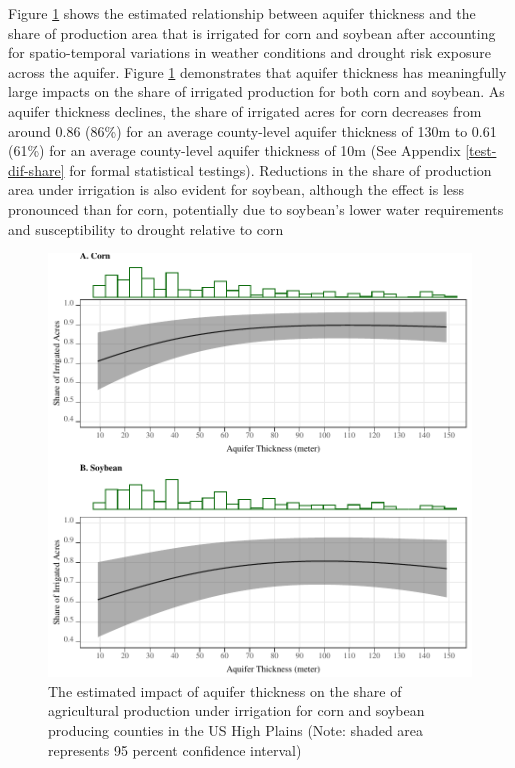 \documentclass[
]{article}
\begin{document}
Figure \ref{fig:ir-share} shows the estimated relationship between aquifer thickness and the share of production area that is irrigated for corn and soybean after accounting for spatio-temporal variations in weather conditions and drought risk exposure across the aquifer. Figure \ref{fig:ir-share} demonstrates that aquifer thickness has meaningfully large impacts on the share of irrigated production for both corn and soybean. As aquifer thickness declines, the share of irrigated acres for corn decreases from around 0.86 (86\%) for an average county-level aquifer thickness of 130m to 0.61 (61\%) for an average county-level aquifer thickness of 10m (See Appendix \ref{test-dif-share} for formal statistical testings). Reductions in the share of production area under irrigation is also evident for soybean, although the effect is less pronounced than for corn, potentially due to soybean's lower water requirements and susceptibility to drought relative to corn \citep{zipper2016drought, ruess2022irrigation}

\begin{figure}[H]

{\centering \includegraphics[width=5in,]{Figures/g_share} 

}

\caption{The estimated impact of aquifer thickness on the share of agricultural production under irrigation for corn and soybean producing counties in the US High Plains (Note: shaded area represents 95 percent confidence interval)}\label{fig:ir-share}
\end{figure}
\end{document}
